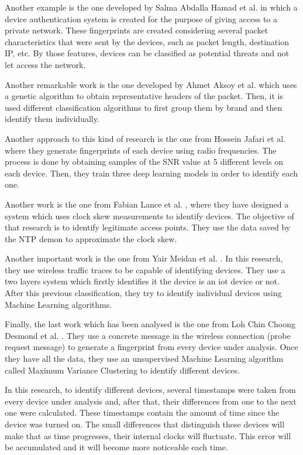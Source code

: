 Another example is the one developed by Salma Abdalla Hamad et al. \cite{hamad2019iot} in which a device authentication system is created for the purpose of giving access to a private network. These fingerprints are created considering several packet characteristics that were sent by the devices, such as packet length, destination IP, etc. By those features, devices can be classified as potential threats and not let access the network. 

Another remarkable work is the one developed by Ahmet Aksoy et al. \cite{aksoy2019automated} which uses a genetic algorithm to obtain representative headers of the packet. Then, it is used different classification algorithms to first group them by brand and then identify them individually. 

Another approach to this kind of research is the one from Hossein Jafari et al. \cite{jafari2018iot} where they generate fingerprints of each device using radio frequencies. The process is done by obtaining samples of the SNR value at 5 different levels on each device. Then, they train three deep learning models in order to identify each one.

Another work is the one from Fabian Lance et al. \cite{lanze2012clock}, where they have designed a system which uses clock skew measurements to identify devices. The objective of that research is to identify legitimate access points. They use the data saved by the NTP demon to approximate the clock skew.

Another important work is the one from Yair Meidan et al. \cite{meidan2017profiliot}. In this research, they use wireless traffic traces to be capable of identifying devices. They use a two layers system which firstly identifies it the device is an \acrshort{iot} device or not. After this previous classification, they try to identify individual devices using Machine Learning algorithms.

Finally, the last work which has been analysed is the one from Loh Chin Choong Desmond et al. \cite{desmond2008identifying}. They use a concrete message in the wireless connection (probe request message) to generate a fingerprint from every device under analysis. Once they have all the data, they use an unsupervised Machine Learning algorithm called Maximum Variance Clustering to identify different devices.

In this research, to identify different devices, several timestamps were taken from every device under analysis and, after that, their differences from one to the next one were calculated. These timestamps contain the amount of time since the device was turned on. The small differences that distinguish these devices will make that as time progresses, their internal clocks will fluctuate. This error will be accumulated and it will become more noticeable each time.

